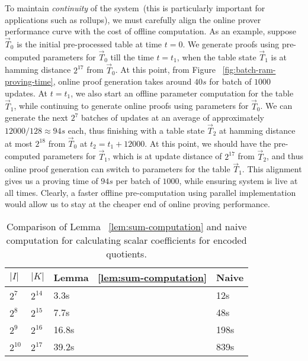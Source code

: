 To maintain {\em continuity} of the system~(this is particularly important for applications such as rollups), we must carefully
align the online prover performance curve with the cost of offline computation.  As an example, suppose $\vec{T}_0$
is the initial pre-processed table at time $t=0$. We generate proofs using pre-computed parameters for $\vec{T}_0$
till the time $t=t_1$, when the table state $\vec{T}_1$ is at hamming distance $2^{17}$ from $\vec{T}_0$. At this point,
from Figure ~\ref{fig:batch-ram-proving-time}, online proof generation takes around $40s$ for batch of $1000$ updates.
At $t=t_1$, we also start an offline parameter computation for the table $\vec{T}_1$, while continuing to generate
online proofs using parameters for $\vec{T}_0$. We can generate the next $2^7$ batches of updates at an average of
approximately $12000/128\approx 94s$ each, thus finishing with a table state $\vec{T}_2$ at hamming distance at most
$2^{18}$ from $\vec{T}_0$ at $t_2=t_1+12000$. At this point, we should have the pre-computed parameters for $\vec{T}_1$,
which is at update distance of $2^{17}$ from $\vec{T}_2$, and thus online proof generation can switch to parameters
for the table $\vec{T}_1$. This alignment gives us a proving time of $94s$ per batch of $1000$, while ensuring system
is live at all times. Clearly, a faster offline pre-computation using parallel implementation would allow us to stay
at the cheaper end of online proving performance.


\begin{table}[htbp]
    \centering
    \begin{tabularx}{0.45\textwidth}{@{}XXXX@{}}
        \toprule
        $|I|$ & $|K|$ & Lemma ~\ref{lem:sum-computation} & Naive \\ \midrule
        $2^7$ & $2^{14}$ & 3.3s  & 12s \\
        $2^8$ & $2^{15}$ & 7.7s  & 48s \\
        $2^9$ & $2^{16}$ & 16.8s & 198s \\
        $2^{10}$ & $2^{17}$ & 39.2s & 839s \\
        \bottomrule
    \end{tabularx}
    \caption{Comparison of Lemma ~\ref{lem:sum-computation} and naive computation for calculating
    scalar coefficients for encoded quotients.}
    \label{tbl:sum-computation-compare}
    \vspace*{-5mm}
\end{table}

